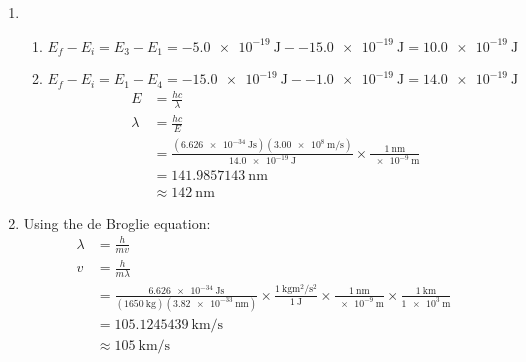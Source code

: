 \documentclass[11pt,letterpaper]{article}
\begin{document}
\begin{enumerate}
	  \item \begin{enumerate}
		  \item $E_f - E_i = E_3 - E_1 = \SI{-5.0e-19}{\joule} -
			  \SI{-15.0e-19}{\joule} = \boxed{\SI{10.0e-19}{\joule}}$
		  \item $E_f - E_i = E_1 - E_4 = \SI{-15.0e-19}{\joule} -
			  \SI{-1.0e-19}{\joule} = \SI{14.0e-19}{\joule}$
			  \begin{align*}
				  E &= \frac{hc}{\lambda} \\
				  \lambda &= \frac{hc}{E} \\
				  &=
				  \frac{(\SI{6.626e-34}{\joule\second})(\SI{3.00e8}{\meter\per\second})}{\SI{14.0e-19}{\joule}}
				  \times
				  \frac{\SI{1}{\nano\meter}}{\SI{e-9}{\meter}}
				  \\
				  &= \SI{141.9857143}{\nano\meter} \\
				  &\approx \boxed{\SI{142}{\nano\meter}}
			  \end{align*}
	  \end{enumerate}
  \item Using the de Broglie equation:
	  \begin{align*}
		  \lambda &= \frac{h}{mv} \\
		  v &= \frac{h}{m\lambda} \\
		  &= \frac{\SI{6.626e-34}{\joule\second}}
		  {(\SI{1650}{\kilo\gram})(\SI{3.82e-33}{\nano\meter})} \times
		  \frac{\SI{1}{\kilo\gram\meter\squared\per\second\squared}}{\SI{1}{\joule}}
		  \times
		  \frac{\SI{1}{\nano\meter}}{\SI{e-9}{\meter}} 
		  \times
		  \frac{\SI{1}{\kilo\meter}}{\SI{1e3}{\meter}} \\
		  &= \SI{105.1245439}{\kilo\meter\per\second} \\
		  &\approx \boxed{\SI{105}{\kilo\meter\per\second}}
	  \end{align*}
\end{enumerate}
\end{document}
